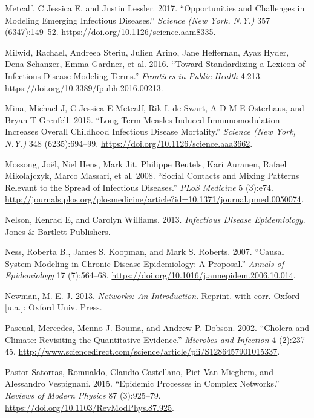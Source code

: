 \documentclass[]{book}
\theoremstyle{definition}
\theoremstyle{definition}
\theoremstyle{definition}
\theoremstyle{remark}
\begin{document}
\leavevmode\hypertarget{ref-metcalf17}{}%
Metcalf, C Jessica E, and Justin Lessler. 2017. ``Opportunities and
Challenges in Modeling Emerging Infectious Diseases.'' \emph{Science
(New York, N.Y.)} 357 (6347):149--52.
\url{https://doi.org/10.1126/science.aam8335}.

\leavevmode\hypertarget{ref-milwid16}{}%
Milwid, Rachael, Andreea Steriu, Julien Arino, Jane Heffernan, Ayaz
Hyder, Dena Schanzer, Emma Gardner, et al. 2016. ``Toward Standardizing
a Lexicon of Infectious Disease Modeling Terms.'' \emph{Frontiers in
Public Health} 4:213. \url{https://doi.org/10.3389/fpubh.2016.00213}.

\leavevmode\hypertarget{ref-mina15}{}%
Mina, Michael J, C Jessica E Metcalf, Rik L de Swart, A D M E Osterhaus,
and Bryan T Grenfell. 2015. ``Long-Term Measles-Induced Immunomodulation
Increases Overall Childhood Infectious Disease Mortality.''
\emph{Science (New York, N.Y.)} 348 (6235):694--99.
\url{https://doi.org/10.1126/science.aaa3662}.

\leavevmode\hypertarget{ref-mossong08}{}%
Mossong, Joël, Niel Hens, Mark Jit, Philippe Beutels, Kari Auranen,
Rafael Mikolajczyk, Marco Massari, et al. 2008. ``Social Contacts and
Mixing Patterns Relevant to the Spread of Infectious Diseases.''
\emph{PLoS Medicine} 5 (3):e74.
\url{http://journals.plos.org/plosmedicine/article?id=10.1371/journal.pmed.0050074}.

\leavevmode\hypertarget{ref-nelson13}{}%
Nelson, Kenrad E, and Carolyn Williams. 2013. \emph{Infectious Disease
Epidemiology}. Jones \& Bartlett Publishers.

\leavevmode\hypertarget{ref-ness07}{}%
Ness, Roberta B., James S. Koopman, and Mark S. Roberts. 2007. ``Causal
System Modeling in Chronic Disease Epidemiology: A Proposal.''
\emph{Annals of Epidemiology} 17 (7):564--68.
\url{https://doi.org/10.1016/j.annepidem.2006.10.014}.

\leavevmode\hypertarget{ref-newman13}{}%
Newman, M. E. J. 2013. \emph{Networks: An Introduction}. Reprint. with
corr. Oxford {[}u.a.{]}: Oxford Univ. Press.

\leavevmode\hypertarget{ref-pascual02}{}%
Pascual, Mercedes, Menno J. Bouma, and Andrew P. Dobson. 2002. ``Cholera
and Climate: Revisiting the Quantitative Evidence.'' \emph{Microbes and
Infection} 4 (2):237--45.
\url{http://www.sciencedirect.com/science/article/pii/S1286457901015337}.

\leavevmode\hypertarget{ref-pastor-satorras15}{}%
Pastor-Satorras, Romualdo, Claudio Castellano, Piet Van Mieghem, and
Alessandro Vespignani. 2015. ``Epidemic Processes in Complex Networks.''
\emph{Reviews of Modern Physics} 87 (3):925--79.
\url{https://doi.org/10.1103/RevModPhys.87.925}.
\end{document}
